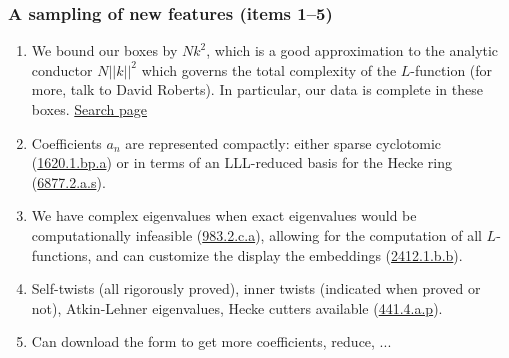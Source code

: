 \documentclass[xcolor=dvipsnames]{beamer}
\theoremstyle{plain}
\begin{document}
\begin{frame}[plain]
\frametitle{A sampling of new features (items 1--5)} \pause

\begin{enumerate}
\item We bound our boxes by $Nk^2$, which is a good approximation to the analytic conductor $N\lvert\lvert k \rvert\rvert^2$ which governs the total complexity of the $L$-function (for more, talk to David Roberts).  \pause  In particular, our data is complete in these boxes.  \href{http://cmfs.lmfdb.xyz/ModularForm/GL2/Q/holomorphic/}{Search page} \pause 
\item Coefficients $a_n$ are represented compactly: either sparse cyclotomic (\href{http://cmfs.lmfdb.xyz/ModularForm/GL2/Q/holomorphic/1620/1/bp/a/}{1620.1.bp.a}) or \pause 
in terms of an LLL-reduced basis for the Hecke ring (\href{http://cmfs.lmfdb.xyz/ModularForm/GL2/Q/holomorphic/6877/2/a/s/}{6877.2.a.s}). \pause
\item We have complex eigenvalues when exact eigenvalues would be computationally infeasible (\href{http://cmfs.lmfdb.xyz/ModularForm/GL2/Q/holomorphic/983/2/c/a/}{983.2.c.a}), allowing for the computation of all $L$-functions, and can customize the display the embeddings (\href{http://cmfs.lmfdb.xyz/ModularForm/GL2/Q/holomorphic/2412/1/b/b/}{2412.1.b.b}). \pause
\item Self-twists (all rigorously proved), inner twists (indicated when proved or not), Atkin-Lehner eigenvalues, Hecke cutters available (\href{http://cmfs.lmfdb.xyz/ModularForm/GL2/Q/holomorphic/441/4/a/p/}{441.4.a.p}). \pause
\item Can download the form to get more coefficients, reduce, ...
\end{enumerate}
\end{frame}
\end{document}
